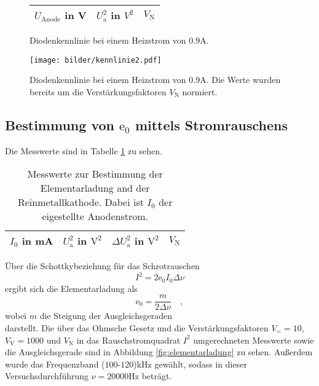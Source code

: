 	\begin{figure}[htbp]
	\begin{minipage}{0.4\textwidth}
			\centering
			\begin{tabular}{ccc}
				\toprule \midrule
				$U_\text{Anode}$ in V & $U_\text{a}^2$ in $V^2$
				& $V_\text{N}$\\
				\midrule
				
				\midrule \bottomrule
			\end{tabular}
			\caption{Diodenkennlinie bei einem Heizstrom von
			$0.9$A.}
			\label{tab:kennlinie2}
	\end{minipage}
	\hfill
	\begin{minipage}{0.6\textwidth}
			\centering
			\texttt{[image: bilder/kennlinie2.pdf]}
			\caption{Diodenkennlinie bei einem Heizstrom von
			$0.9$A. Die Werte wurden bereits um die
			Verstärkungsfaktoren $V_\text{N}$ normiert.}
			\label{fig:kennlinie2}
	\end{minipage}
	\end{figure}



\clearpage
\subsection{Bestimmung von $\text{e}_0$ mittels Stromrauschens}

	Die Messwerte sind in Tabelle \ref{tab:elementarladung_messwerte}
	zu sehen.
	\begin{table}[h]
	\centering
		\begin{tabular}{cccc}
		\toprule
		\midrule
			$I_0$ in mA & $U^2_\text{a}$ in $\text{V}^2$ &
			$\Delta U_\text{a}^2$ in $\text{V}^2$ & $V_\text{N}$ \\
			\midrule
			
			\midrule
			\bottomrule
		\end{tabular}
		\caption{Messwerte zur Bestimmung der Elementarladung
		and der Reinmetallkathode. Dabei ist $I_0$ der eigestellte
		Anodenstrom.}
		\label{tab:elementarladung_messwerte}
	\end{table}

	Über die Schottkybeziehung für das Schrotrauschen
	\begin{equation}
		I^2 = 2 \text{e}_0 I_0 \Delta \nu
	\end{equation}
	ergibt sich die Elementarladung als
	\begin{equation}
	\text{e}_0 = \frac{m}{2 \Delta \nu} \quad ,
	\end{equation}
	wobei $m$ die Steigung der Ausgleichsgeraden
	\begin{equation}
	
	\end{equation}
	darstellt. Die über das Ohmsche Gesetz und die
	Verstärkungsfaktoren $V_= =10$, $V_\text{V}=1000$ und
	$V_\text{N}$ in das Rauschstromquadrat $I^2$ umgerechneten
	Messwerte sowie die Ausgleichsgerade sind in Abbildung
	\ref{fig:elementarladung} zu sehen. Außerdem wurde das
	Frequenzband ($100$-$120$)kHz gewählt, sodass in dieser
	Versuchsdurchführung $\nu = 20000$Hz beträgt.

